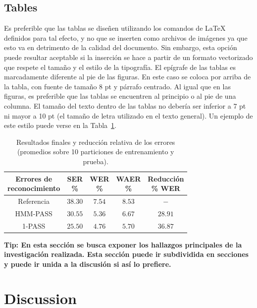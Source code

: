 \documentclass{sophicart}
\begin{document}
\subsection{Tables}
Es preferible que las tablas se diseñen utilizando los comandos de \LaTeX\xspace definidos para tal efecto,
y no que se inserten como archivos de imágenes ya que esto va en detrimento de la calidad del
documento. Sin embargo, esta opción puede resultar aceptable si la inserción se hace a partir de un
formato vectorizado que respete el tamaño y el estilo de la tipografía.
El epígrafe de las tablas es marcadamente diferente al pie de las figuras. En este caso se coloca por
arriba de la tabla, con fuente de tamaño 8 pt y párrafo centrado.
Al igual que en las figuras, es preferible que las tablas se encuentren al principio o al pie de una
columna. El tamaño del texto dentro de las tablas no debería ser inferior a 7 pt ni mayor a 10 pt (el
tamaño de letra utilizado en el texto general).
Un ejemplo de este estilo puede verse en la Tabla~\ref{tabla-1}.

\begin{table}[!b]
 \centering
  \caption{Resultados finales y reducción relativa de los errores (promedios sobre 10 particiones de
 entrenamiento y prueba).} \label{tabla-1}
 {\small
 \begin{tabular}{ccccc}
  \hline
  \hline
  \thead{Errores de \\ reconocimiento} & \thead{SER \\ \%} & \thead{WER \\ \%} & \thead{WAER \\ \%} &
                        \thead{Reducción \\ \% WER} \\
  \hline
  \hline
  Referencia & $38.30$ & $7.54$ & $8.53$ & $-$ \\
  \hline
  HMM-PASS & $30.55$ & $5.36$ & $6.67$ & $28.91$ \\
  1-PASS & $25.50$ & $4.76$ & $5.70$ & $36.87$   \\
  \hline
  \hline
 \end{tabular}}
\end{table}

\textbf{Tip: En esta sección se busca exponer los hallazgos principales de la investigación realizada. Esta sección puede ir subdividida en secciones y puede ir unida a la discusión si así lo prefiere.} 

\section{Discussion}
\end{document}
